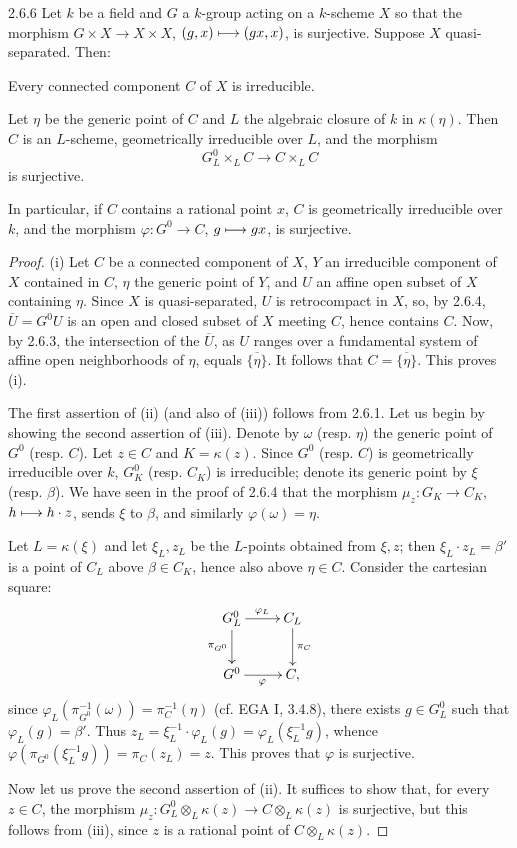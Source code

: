\begin{proposition}{2.6.6}\label{VIA.2.6.6}
Let $k$ be a field and $G$ a $k$-group acting on a $k$-scheme $X$ so that the morphism $G\times X\to X\times X$, $(g,x)\longmapsto(gx,x)$, is surjective. Suppose $X$ quasi-separated. Then:
\begin{enumeratei}
\item Every connected component $C$ of $X$ is irreducible.
\item Let $\eta$ be the generic point of $C$ and $L$ the algebraic closure of $k$ in $\kappa(\eta)$. Then $C$ is an $L$-scheme, geometrically irreducible over $L$, and the morphism
\[
G^0_L\times_LC\to C\times_LC
\]
is surjective.
\item In particular, if $C$ contains a rational point $x$, $C$ is geometrically irreducible over $k$, and the morphism $\varphi:G^0\to C$, $g\longmapsto gx$, is surjective.
\end{enumeratei}
\end{proposition}
\begin{proof}
(i) Let $C$ be a connected component of $X$, $Y$ an irreducible component of $X$ contained in $C$, $\eta$ the generic point of $Y$, and $U$ an affine open subset of $X$ containing $\eta$. Since $X$ is quasi-separated, $U$ is retrocompact in $X$, so, by 2.6.4, $\overline U=G^0U$ is an open and closed subset of $X$ meeting $C$, hence contains $C$. Now, by 2.6.3, the intersection of the $\overline U$, as $U$ ranges over a fundamental system of affine open neighborhoods of $\eta$, equals $\overline{\{\eta\}}$. It follows that $C=\overline{\{\eta\}}$. This proves (i).

The first assertion of (ii) (and also of (iii)) follows from 2.6.1. Let us begin by showing the second assertion of (iii). Denote by $\omega$ (resp. $\eta$) the generic point of $G^0$ (resp. $C$). Let $z\in C$ and $K=\kappa(z)$. Since $G^0$ (resp. $C$) is geometrically irreducible over $k$, $G^0_K$ (resp. $C_K$) is irreducible; denote its generic point by $\xi$ (resp. $\beta$). We have seen in the proof of 2.6.4 that the morphism $\mu_z:G_K\to C_K$, $h\longmapsto h\cdot z$, sends $\xi$ to $\beta$, and similarly $\varphi(\omega)=\eta$.

Let $L=\kappa(\xi)$ and let $\xi_L,z_L$ be the $L$-points obtained from $\xi,z$; then $\xi_L\cdot z_L=\beta'$ is a point of $C_L$ above $\beta\in C_K$, hence also above $\eta\in C$. Consider the cartesian square:
\[
\xymatrix{G^0_L\ar[r]^{\varphi_L}\ar[d]_{\pi_{G^0}}&C_L\ar[d]^{\pi_C}\\G^0\ar[r]_\varphi&C,}
\]
since $\varphi_L(\pi_{G^0}^{-1}(\omega))=\pi_C^{-1}(\eta)$ (cf. EGA I, 3.4.8), there exists $g\in G^0_L$ such that $\varphi_L(g)=\beta'$. Thus $z_L=\xi_L^{-1}\cdot\varphi_L(g)=\varphi_L(\xi_L^{-1}g)$, whence $\varphi(\pi_{G^0}(\xi_L^{-1}g))=\pi_C(z_L)=z$. This proves that $\varphi$ is surjective.

Now let us prove the second assertion of (ii). It suffices to show that, for every $z\in C$, the morphism $\mu_z:G^0_L\otimes_L\kappa(z)\to C\otimes_L\kappa(z)$ is surjective, but this follows from (iii), since $z$ is a rational point of $C\otimes_L\kappa(z)$.
\end{proof}
